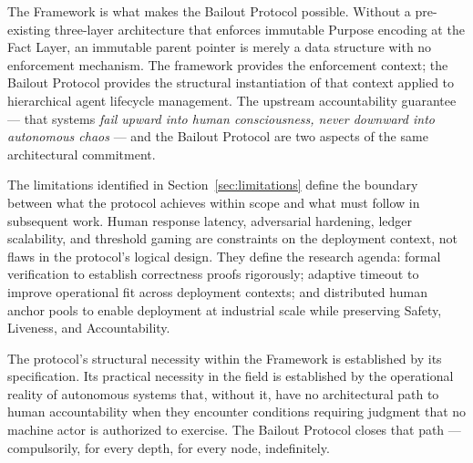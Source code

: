 The \bxthree{} Framework is what makes the Bailout Protocol possible. Without a pre-existing three-layer architecture that enforces immutable Purpose encoding at the Fact Layer, an immutable parent pointer is merely a data structure with no enforcement mechanism. The framework provides the enforcement context; the Bailout Protocol provides the structural instantiation of that context applied to hierarchical agent lifecycle management. The upstream accountability guarantee — that \bxthree{} systems \emph{fail upward into human consciousness, never downward into autonomous chaos} — and the Bailout Protocol are two aspects of the same architectural commitment.

The limitations identified in Section~\ref{sec:limitations} define the boundary between what the protocol achieves within scope and what must follow in subsequent work. Human response latency, adversarial hardening, ledger scalability, and threshold gaming are constraints on the deployment context, not flaws in the protocol's logical design. They define the research agenda: formal verification to establish correctness proofs rigorously; adaptive timeout to improve operational fit across deployment contexts; and distributed human anchor pools to enable deployment at industrial scale while preserving Safety, Liveness, and Accountability.

The protocol's structural necessity within the \bxthree{} Framework is established by its specification. Its practical necessity in the field is established by the operational reality of autonomous systems that, without it, have no architectural path to human accountability when they encounter conditions requiring judgment that no machine actor is authorized to exercise. The Bailout Protocol closes that path — compulsorily, for every depth, for every node, indefinitely.